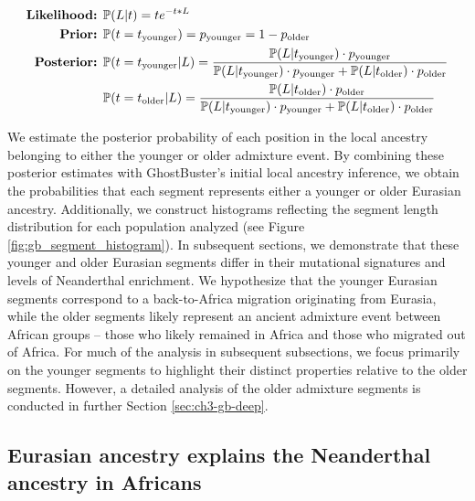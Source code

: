 \begin{align}
    \text{\textbf{Likelihood:} \vspace{2mm}} & \mathbb{P}(L | t) = t e^{-t * L} \nonumber \\
    \text{\textbf{Prior:} \vspace{2mm}} & \mathbb{P}(t = t_{\text{younger}}) = p_{\text{younger}}  = 1 - p_{\text{older}} \nonumber \\
    \text{\textbf{Posterior:} \vspace{2mm}} & \mathbb{P}(t = t_{\text{younger}} | L) = \frac{\mathbb{P}(L | t_{\text{younger}}) \cdot p_{\text{younger}}}{\mathbb{P}(L | t_{\text{younger}}) \cdot p_{\text{younger}} + \mathbb{P}(L | t_{\text{older}}) \cdot p_{\text{older}}} \nonumber \\
    & \mathbb{P}(t = t_{\text{older}} | L) = \frac{\mathbb{P}(L | t_{\text{older}}) \cdot p_{\text{older}}}{\mathbb{P}(L | t_{\text{younger}}) \cdot p_{\text{younger}} + \mathbb{P}(L | t_{\text{older}}) \cdot p_{\text{older}}}
\end{align}

We estimate the posterior probability of each position in the local ancestry belonging to either the younger or older admixture event. By combining these posterior estimates with GhostBuster's initial local ancestry inference, we obtain the probabilities that each segment represents either a younger or older Eurasian ancestry. Additionally, we construct histograms reflecting the segment length distribution for each population analyzed (see Figure \ref{fig:gb_segment_histogram}). In subsequent sections, we demonstrate that these younger and older Eurasian segments differ in their mutational signatures and levels of Neanderthal enrichment. We hypothesize that the younger Eurasian segments correspond to a back-to-Africa migration originating from Eurasia, while the older segments likely represent an ancient admixture event between African groups -- those who likely remained in Africa and those who migrated out of Africa. For much of the analysis in subsequent subsections, we focus primarily on the younger segments to highlight their distinct properties relative to the older segments. However, a detailed analysis of the older admixture segments is conducted in further Section \ref{sec:ch3-gb-deep}.


\subsection{Eurasian ancestry explains the Neanderthal ancestry in Africans}

